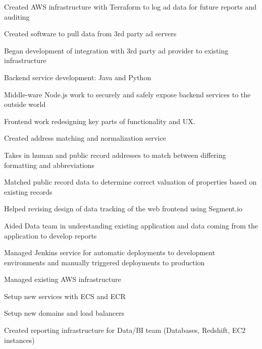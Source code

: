\documentclass[table,tmargin=1in,bmargin=1in,letterpaper]{resume}
\begin{document}
\begin{compactitem}
\item Created AWS infrastructure with Terraform to log ad data for future reports and auditing
\item Created software to pull data from 3rd party ad servers
\item Began development of integration with 3rd party ad provider to existing infrastructure
\end{compactitem}

\begin{compactitem}
\item Backend service development: Java and Python
\item Middle-ware Node.js work to securely and safely expose backend services to the outside world
\item Frontend work redesigning key parts of functionality and UX.
\item Created address matching and normalization service
  \begin{compactitem}
  \item Takes in human and public record addresses to match between differing formatting and abbreviations
  \item Matched public record data to determine correct valuation of properties based on existing records
  \end{compactitem}
\item Helped revising design of data tracking of the web frontend using Segment.io
\item Aided Data team in understanding existing application and data coming from the application to develop reports
\item Managed Jenkins service for automatic deployments to development environments and manually triggered deployments to production
\item Managed existing AWS infrastructure
  \begin{compactitem}
  \item Setup new services with ECS and ECR
  \item Setup new domains and load balancers
  \item Created reporting infrastructure for Data/BI team (Databases, Redshift, EC2 instances)
  \end{compactitem}
\end{compactitem}
\end{document}
